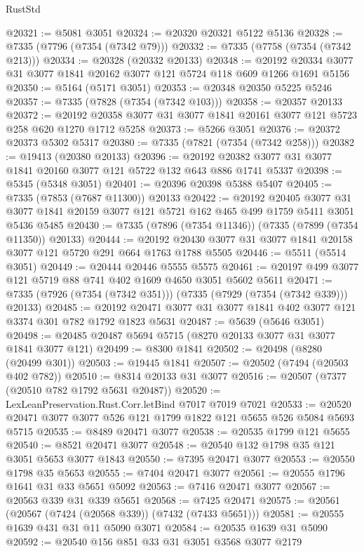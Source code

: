 \begin{lexlean}{RustStd}
\begin{coremodule}
@20321 := @5081 @3051
@20324 := @20320 @20321 @5122 @5136
@20328 := @7335 (@7796 (@7354 (@7342 @79)))
@20332 := @7335 (@7758 (@7354 (@7342 @213)))
@20334 := @20328 (@20332 @20133)
@20348 := @20192 @20334 @3077 @31 @3077 @1841 @20162 @3077 @121 @5724 @118 @609 @1266 @1691 @5156
@20350 := @5164 (@5171 @3051)
@20353 := @20348 @20350 @5225 @5246
@20357 := @7335 (@7828 (@7354 (@7342 @103)))
@20358 := @20357 @20133
@20372 := @20192 @20358 @3077 @31 @3077 @1841 @20161 @3077 @121 @5723 @258 @620 @1270 @1712 @5258
@20373 := @5266 @3051
@20376 := @20372 @20373 @5302 @5317
@20380 := @7335 (@7821 (@7354 (@7342 @258)))
@20382 := @19413 (@20380 @20133)
@20396 := @20192 @20382 @3077 @31 @3077 @1841 @20160 @3077 @121 @5722 @132 @643 @886 @1741 @5337
@20398 := @5345 (@5348 @3051)
@20401 := @20396 @20398 @5388 @5407
@20405 := @7335 (@7853 (@7687 @11300)) @20133
@20422 := @20192
    @20405
    @3077
    @31
    @3077
    @1841
    @20159
    @3077
    @121
    @5721
    @162
    @465
    @499
    @1759
    @5411
    @3051
    @5436
    @5485
@20430 := @7335 (@7896 (@7354 @11346)) (@7335 (@7899 (@7354 @11350)) @20133)
@20444 := @20192 @20430 @3077 @31 @3077 @1841 @20158 @3077 @121 @5720 @291 @664 @1763 @1788 @5505
@20446 := @5511 (@5514 @3051)
@20449 := @20444 @20446 @5555 @5575
@20461 := @20197 @499 @3077 @121 @5719 @88 @741 @402 @1609 @4650 @3051 @5602 @5611
@20471 := @7335 (@7926 (@7354 (@7342 @351))) (@7335 (@7929 (@7354 (@7342 @339))) @20133)
@20485 := @20192 @20471 @3077 @31 @3077 @1841 @402 @3077 @121 @3374 @301 @782 @1792 @1823 @5631
@20487 := @5639 (@5646 @3051)
@20498 := @20485 @20487 @5694 @5715 (@8270 @20133 @3077 @31 @3077 @1841 @3077 @121)
@20499 := @8300 @1841
@20502 := @20498 (@8280 (@20499 @301))
@20503 := @19445 @1841
@20507 := @20502 (@7494 (@20503 @402 @782))
@20510 := @8314 @20133 @31 @3077
@20516 := @20507 (@7377 (@20510 @782 @1792 @5631 @20487))
@20520 := LexLeanPreservation.Rust.Corr.letBind @7017 @7019 @7021
@20533 := @20520 @20471 @3077 @3077 @526 @121 @1799 @1822 @121 @5655 @526 @5084 @5693 @5715
@20535 := @8489 @20471 @3077
@20538 := @20535 @1799 @121 @5655
@20540 := @8521 @20471 @3077
@20548 := @20540 @132 @1798 @35 @121 @3051 @5653 @3077 @1843
@20550 := @7395 @20471 @3077
@20553 := @20550 @1798 @35 @5653
@20555 := @7404 @20471 @3077
@20561 := @20555 @1796 @1641 @31 @33 @5651 @5092
@20563 := @7416 @20471 @3077
@20567 := @20563 @339 @31 @339 @5651
@20568 := @7425 @20471
@20575 := @20561 (@20567 (@7424 (@20568 @339)) (@7432 (@7433 @5651)))
@20581 := @20555 @1639 @431 @31 @11 @5090 @3071
@20584 := @20535 @1639 @31 @5090
@20592 := @20540 @156 @851 @33 @31 @3051 @3568 @3077 @2179

\end{coremodule}
\end{lexlean}
